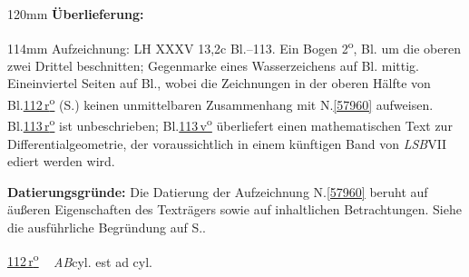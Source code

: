 %
\frenchspacing%
\begin{ledgroupsized}[r]{120mm}%
\footnotesize%
\pstart%
\noindent%
\textbf{Überlieferung:}%
\pend%
\end{ledgroupsized}%
\begin{ledgroupsized}[r]{114mm}%
\footnotesize%
\pstart%
\parindent -6mm%
%
Aufzeichnung:
LH XXXV 13,\;2c Bl.--113.
Ein Bogen 2\textsuperscript{o},
Bl. um die oberen zwei Drittel beschnitten;
Gegenmarke eines Wasserzeichens auf Bl. mittig. %
Eineinviertel Seiten auf Bl.,
wobei die Zeichnungen in der oberen Hälfte von Bl.\;\href{\Scan{LH_35_13_02c_112r}}{112\,r\textsuperscript{o}} (S.\;\pageref{LH_35_13_02c_112r_zchn}) keinen unmittelbaren Zusammenhang mit N.\;\ref{57960} aufweisen.
Bl.\;\href{\Scan{LH_35_13_02c_113r}}{113\,r\textsuperscript{o}} ist unbeschrieben;
Bl.\;\href{\Scan{LH_35_13_02c_113v}}{113\,v\textsuperscript{o}} überliefert einen mathematischen Text zur Differentialgeometrie, der voraussichtlich in einem künftigen Band von \textit{LSB}\;VII ediert werden wird.%
\pend%
\end{ledgroupsized}%
\vspace{5mm}%
\begin{ledgroup}%
\footnotesize%
\pstart%
\noindent%
\textbf{Datierungsgründe:}
Die Datierung der Aufzeichnung N.\;\ref{57960} beruht auf äußeren Eigenschaften des Texträgers sowie auf inhaltlichen Betrachtungen.
Siehe die ausführliche Begründung auf S.\;\pageref{57960_dat}.%
\pend%
\end{ledgroup}%
%
\frenchspacing%
\vspace*{6mm}
\normalsize%
\pstart%
\noindent%
\lbrack%
\href{\Scan{LH_35_13_02c_112r}}%
{112\,r\textsuperscript{o}}%
\rbrack\ %
%
%
\textit{AB}\;cyl.%
est ad cyl.\;%
